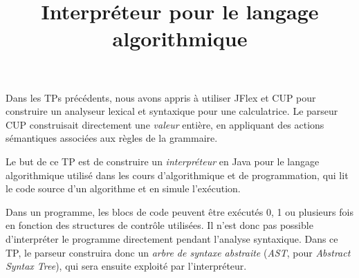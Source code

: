 \documentclass{td}
\title{Interpréteur pour le langage algorithmique}
\begin{document}
\maketitle

Dans les TPs précédents, nous avons appris à utiliser JFlex et CUP pour construire
un analyseur lexical et syntaxique pour une calculatrice.
Le parseur CUP construisait directement une \emph{valeur} entière,
en appliquant des actions sémantiques associées aux règles de la grammaire.

Le but de ce TP est de construire un \emph{interpréteur} en Java pour le langage algorithmique
utilisé dans les cours d'algorithmique et de programmation, qui lit le code source d'un algorithme
et en simule l'exécution.

Dans un programme, les blocs de code peuvent être exécutés 0, 1 ou plusieurs fois en fonction des
structures de contrôle utilisées. Il n'est donc pas possible d'interpréter le programme directement
pendant l'analyse syntaxique. Dans ce TP, le parseur construira donc un \emph{arbre de syntaxe abstraite}
(\emph{AST}, pour \emph{Abstract Syntax Tree}), qui sera ensuite exploité par l'interpréteur.
\end{document}
